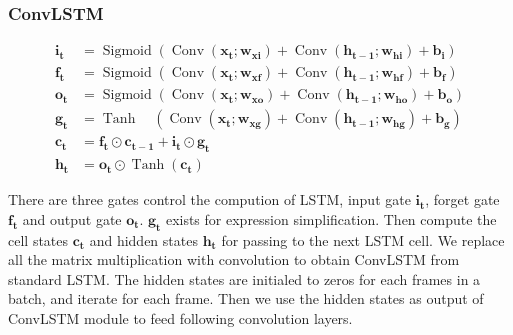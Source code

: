 \documentclass[final]{cvpr}
\begin{document}
\subsubsection{ConvLSTM}

\begin{equation}\label{convLSTM}
    \begin{aligned}
        \mathbf{i}_{\mathbf{t}} & = \operatorname{Sigmoid}\left(\operatorname{Conv}\left(\mathbf{x}_{\mathbf{t}} ; \mathbf{w}_{\mathbf{x i}}\right)+\operatorname{Conv}\left(\mathbf{h}_{\mathbf{t}-\mathbf{1}} ; \mathbf{w}_{\mathbf{h i}}\right)+\mathbf{b}_{\mathbf{i}}\right)    \\
        \mathbf{f}_{\mathbf{t}} & = \operatorname{Sigmoid}\left(\operatorname{Conv}\left(\mathbf{x}_{\mathbf{t}} ; \mathbf{w}_{\mathbf{x f}}\right)+\operatorname{Conv}\left(\mathbf{h}_{\mathbf{t}-\mathbf{1}} ; \mathbf{w}_{\mathbf{h f}}\right)+\mathbf{b}_{\mathbf{f}}\right)    \\
        \mathbf{o}_{\mathbf{t}} & = \operatorname{Sigmoid}\left(\operatorname{Conv}\left(\mathbf{x}_{\mathbf{t}} ; \mathbf{w}_{\mathbf{x o}}\right)+\operatorname{Conv}\left(\mathbf{h}_{\mathbf{t}-\mathbf{1}} ; \mathbf{w}_{\mathbf{h o}}\right)+\mathbf{b}_{\mathbf{o}}\right)    \\
        \mathbf{g}_{\mathbf{t}} & = \operatorname{Tanh} \quad\left(\operatorname{Conv}\left(\mathbf{x}_{\mathbf{t}} ; \mathbf{w}_{\mathbf{x g}}\right)+\operatorname{Conv}\left(\mathbf{h}_{\mathbf{t}-\mathbf{1}} ; \mathbf{w}_{\mathbf{h g}}\right)+\mathbf{b}_{\mathbf{g}}\right) \\
        \mathbf{c}_{\mathbf{t}} & = \mathbf{f}_{\mathbf{t}} \odot \mathbf{c}_{\mathbf{t}-\mathbf{1}}+\mathbf{i}_{\mathbf{t}} \odot \mathbf{g}_{\mathbf{t}}                                                                                                                           \\
        \mathbf{h}_{\mathbf{t}} & = \mathbf{o}_{\mathbf{t}} \odot \operatorname{Tanh}\left(\mathbf{c}_{\mathbf{t}}\right)
    \end{aligned}
\end{equation}

There are three gates control the compution of LSTM, input gate $\mathbf{i}_{\mathbf{t}}$, forget gate $\mathbf{f}_{\mathbf{t}}$ and output gate $\mathbf{o}_{\mathbf{t}}$. $\mathbf{g}_{\mathbf{t}}$ exists for expression simplification.
Then compute the cell states $\mathbf{c}_{\mathbf{t}}$ and hidden states $\mathbf{h}_{\mathbf{t}}$ for passing to the next LSTM cell.
We replace all the matrix multiplication with convolution to obtain ConvLSTM from standard LSTM.
The hidden states are initialed to zeros for each frames in a batch, and iterate for each frame.
Then we use the hidden states as output of ConvLSTM module to feed following convolution layers.
\end{document}
